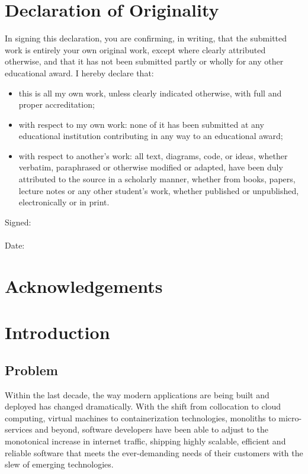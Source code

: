 \documentclass[12pt,pdftex,titlepage]{report}
\begin{document}
    \chapter*{Declaration of Originality}
        In signing this declaration, you are confirming, in writing, that the submitted work
        is entirely your own original work, except where clearly attributed otherwise, and
        that it has not been submitted partly or wholly for any other educational award. I
        hereby declare that:
        \begin{itemize}
            \item this is all my own work, unless clearly indicated otherwise, with full and proper accreditation;  
            \item with respect to my own work: none of it has been submitted at any educational institution contributing in any way to an educational award;
            \item with respect to another’s work: all text, diagrams, code, or ideas, whether verbatim, paraphrased or otherwise modified or adapted, 
            have been duly attributed to the source in a scholarly manner, whether from books, papers, lecture notes or any other student’s work, whether
            published or unpublished, electronically or in print.
        \end{itemize}   
        \vspace{10mm}
        Signed: \dotfill
        \\\\
        Date: \dotfill

    \chapter*{Acknowledgements}
        
    \tableofcontents

    \chapter{Introduction}
    \setcounter{page}{1}
        \section{Problem}
            Within the last decade, the way modern applications are being built and deployed has changed dramatically. With the shift from collocation to cloud computing,
            virtual machines to containerization technologies, monoliths to micro-services and beyond, software developers have been able to adjust to 
            the monotonical increase in internet traffic, shipping highly scalable, efficient and reliable software that meets the ever-demanding needs of their customers
            with the slew of emerging technologies.
\end{document}
